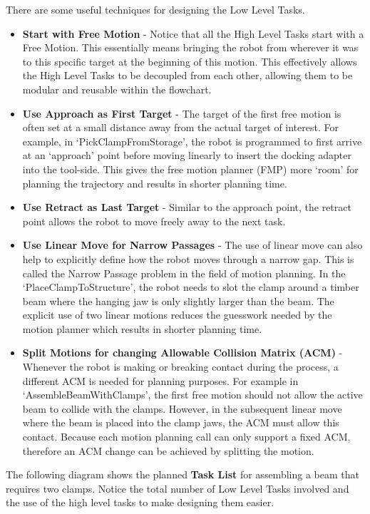 \vspace{1\baselineskip}
There are some useful techniques for designing the Low Level Tasks. 

\begin{itemize}
	\item \textbf{Start with Free Motion} - Notice that all the High Level Tasks start with a Free Motion. This essentially means bringing the robot from wherever it was to this specific target at the beginning of this motion. This effectively allows the High Level Tasks to be decoupled from each other, allowing them to be modular and reusable within the flowchart.

	\item \textbf{Use Approach as First Target} - The target of the first free motion is often set at a small distance away from the actual target of interest. For example, in ‘PickClampFromStorage’, the robot is programmed to first arrive at an ‘approach’ point before moving linearly to insert the docking adapter into the tool-side. This gives the free motion planner (FMP) more ‘room’ for planning the trajectory and results in shorter planning time.

	\item \textbf{Use Retract as Last Target} - Similar to the approach point, the retract point allows the robot to move freely away to the next task.

	\item \textbf{Use Linear Move for Narrow Passages} - The use of linear move can also help to explicitly define how the robot moves through a narrow gap. This is called the Narrow Passage problem in the field of motion planning. In the ‘PlaceClampToStructure’, the robot needs to slot the clamp around a timber beam where the hanging jaw is only slightly larger than the beam. The explicit use of two linear motions reduces the guesswork needed by the motion planner which results in shorter planning time.

	\item \textbf{Split Motions for changing Allowable Collision Matrix (ACM)} - Whenever the robot is making or breaking contact during the process, a different ACM is needed for planning purposes. For example in ‘AssembleBeamWithClamps’, the first free motion should not allow the active beam to collide with the clamps. However, in the subsequent linear move where the beam is placed into the clamp jaws, the ACM must allow this contact. Because each motion planning call can only support a fixed ACM, therefore an ACM change can be achieved by splitting the motion.

\end{itemize}
The following diagram shows the planned \textbf{Task List} for assembling a beam that requires two clamps. Notice the total number of Low Level Tasks involved and the use of the high level tasks to make designing them easier.

